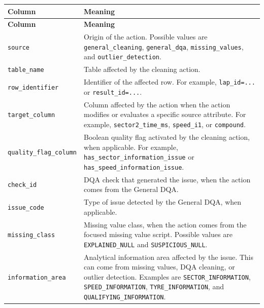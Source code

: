 \documentclass[a4paper,11pt]{article}
\begin{document}
	\begin{longtable}{p{4.5cm}p{10cm}}
		\toprule
		\textbf{Column} & \textbf{Meaning} \\
		\midrule
		\endfirsthead
		
		\toprule
		\textbf{Column} & \textbf{Meaning} \\
		\midrule
		\endhead
		
		\texttt{source}
		& Origin of the action. Possible values are \texttt{general\_cleaning}, \texttt{general\_dqa}, \texttt{missing\_values}, and \texttt{outlier\_detection}. \\
		\midrule
		
		\texttt{table\_name}
		& Table affected by the cleaning action. \\
		\midrule
		
		\texttt{row\_identifier}
		& Identifier of the affected row. For example, \texttt{lap\_id=...} or \texttt{result\_id=...}. \\
		\midrule
		
		\texttt{target\_column}
		& Column affected by the action when the action modifies or evaluates a specific source attribute. For example, \texttt{sector2\_time\_ms}, \texttt{speed\_i1}, or \texttt{compound}. \\
		\midrule
		
		\texttt{quality\_flag\_column}
		& Boolean quality flag activated by the cleaning action, when applicable. For example, \texttt{has\_sector\_information\_issue} or \texttt{has\_speed\_information\_issue}. \\
		\midrule
		
		\texttt{check\_id}
		& DQA check that generated the issue, when the action comes from the General DQA. \\
		\midrule
		
		\texttt{issue\_code}
		& Type of issue detected by the General DQA, when applicable. \\
		\midrule
		
		\texttt{missing\_class}
		& Missing value class, when the action comes from the focused missing value script. Possible values are \texttt{EXPLAINED\_NULL} and \texttt{SUSPICIOUS\_NULL}. \\
		\midrule
		
		\texttt{information\_area}
		& Analytical information area affected by the issue. This can come from missing values, DQA cleaning, or outlier detection. Examples are \texttt{SECTOR\_INFORMATION}, \texttt{SPEED\_INFORMATION}, \texttt{TYRE\_INFORMATION}, and \texttt{QUALIFYING\_INFORMATION}. \\
		\midrule
		

\end{longtable}
\end{document}
